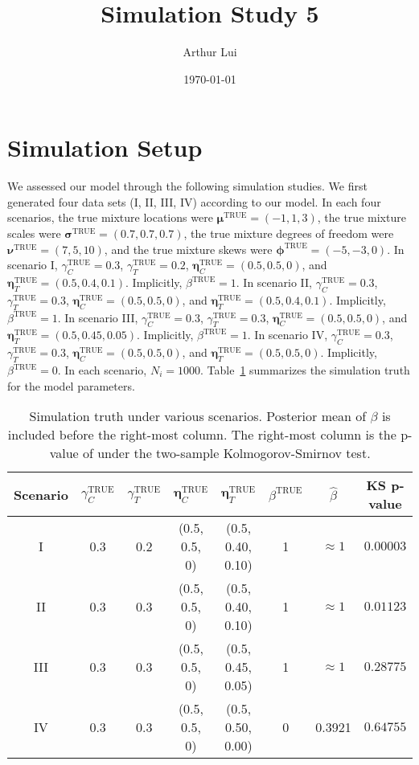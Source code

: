 \documentclass[12pt]{article} %
\title{Simulation Study 5}
\author{Arthur Lui}
\date{\today} %
\newcommand{\true}{\text{TRUE}}
\begin{document}
\maketitle

\section{Simulation Setup}\label{sec:sim-setup}
We assessed our model through the following simulation studies. We first
generated four data sets (I, II, III, IV) according to our model. In each
four scenarios,
%
the true mixture locations were $\bm{\mu}^\true=(-1, 1, 3)$,
the true mixture scales were $\bm{\sigma}^\true=(0.7, 0.7, 0.7)$,
the true mixture degrees of freedom were $\bm{\nu}^\true=(7, 5, 10)$, and
the true mixture skews were $\bm{\phi}^\true=(-5, -3, 0)$.
%
In scenario I, $\gamma_C^\true=0.3$, $\gamma_T^\true=0.2$, $\bm\eta_C^\true=(0.5,
0.5, 0)$, and $\bm\eta_T^\true=(0.5,0.4,0.1)$. Implicitly, $\beta^\true=1$.
In scenario II, $\gamma_C^\true=0.3$, $\gamma_T^\true=0.3$, $\bm\eta_C^\true=(0.5,
0.5, 0)$, and $\bm\eta_T^\true=(0.5,0.4,0.1)$. Implicitly, $\beta^\true=1$.
In scenario III, $\gamma_C^\true=0.3$, $\gamma_T^\true=0.3$, $\bm\eta_C^\true=(0.5,
0.5, 0)$, and $\bm\eta_T^\true=(0.5,0.45,0.05)$. Implicitly, $\beta^\true=1$.
In scenario IV, $\gamma_C^\true=0.3$, $\gamma_T^\true=0.3$, $\bm\eta_C^\true=(0.5,
0.5, 0)$, and $\bm\eta_T^\true=(0.5,0.5,0)$. Implicitly, $\beta^\true=0$.
%
In each scenario, $N_i=1000$. Table~\ref{tab:sim-truth} summarizes the
simulation truth for the model parameters.
\begin{table}
  \centering
  \begin{tabular}{|c|ccccccc|}
    \hline 
    Scenario & $\gamma_C^\true$ & $\gamma_T^\true$ & $\bm\eta_C^\true$ & 
    $\bm\eta_T^\true$ & $\beta^\true$ & $\hat\beta$ & KS p-value \\
    \hline 
    I   & 0.3 & 0.2 & (0.5, 0.5, 0) & (0.5, 0.40, 0.10) & 1 & $\approx 1$ & $0.00003$ \\
    II  & 0.3 & 0.3 & (0.5, 0.5, 0) & (0.5, 0.40, 0.10) & 1 & $\approx 1$ & $0.01123$ \\
    III & 0.3 & 0.3 & (0.5, 0.5, 0) & (0.5, 0.45, 0.05) & 1 & $\approx 1$ & $0.28775$ \\
    IV  & 0.3 & 0.3 & (0.5, 0.5, 0) & (0.5, 0.50, 0.00) & 0 &      0.3921 & $0.64755$ \\
    \hline
  \end{tabular}
  \caption{Simulation truth under various scenarios. Posterior mean of
  $\beta$ is included before the right-most column. The right-most column
  is the p-value of under the two-sample Kolmogorov-Smirnov test.}
  \label{tab:sim-truth}
\end{table}
\end{document}
